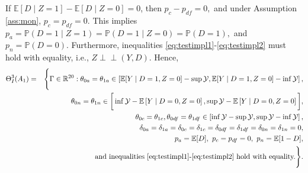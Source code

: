 \documentclass[12pt]{article}
\theoremstyle{plain}
\theoremstyle{definition}
\theoremstyle{remark}
\newcommand{\indep}{\perp \!\!\! \perp}
\begin{document}
If $\mathbb E[D\mid Z=1]-\mathbb E[D\mid Z=0]=0$, then $p_c-p_{df}=0,$ and under Assumption \ref{ass:mon}, $p_c=p_{df}=0$. This implies $p_a=\mathbb P(D=1\mid Z=1)=\mathbb P(D=1\mid Z=0)=\mathbb P(D=1),$ and $p_n=\mathbb P(D=0)$. Furthermore, inequalities \eqref{eq:testimpl1}-\eqref{eq:testimpl2} must hold with equality, i.e., $Z \indep (Y,D)$. Hence, 
\begin{eqnarray*}
    \Theta_I^3(A_1) &=& \Bigg \{\Gamma \in \mathbb R^{20}: \theta_{0a}=\theta_{1a} \in \left[\mathbb E[Y\mid D=1, Z=0]-\sup \mathcal Y, \mathbb E[Y\mid D=1, Z=0]-\inf \mathcal Y\right],\\
    && \qquad \theta_{0n}=\theta_{1n} \in \bigg[\inf \mathcal Y -\mathbb{E}\left[Y \mid D=0, Z=0\right], \sup \mathcal Y - \mathbb{E}\left[Y \mid D=0, Z=0\right]\bigg],\\ 
    && \qquad \theta_{0c}=\theta_{1c}, \theta_{0df}=\theta_{1df} \in \left[\inf \mathcal Y-\sup \mathcal Y, \sup \mathcal Y-\inf \mathcal Y\right],\\
   &&\qquad \delta_{0a}=\delta_{1a}=\delta_{0c}=\delta_{1c}=\delta_{0df}=\delta_{1df}=\delta_{0n}=\delta_{1n}=0,\\
   && \qquad p_a=\mathbb{E}[D],\ p_c=p_{df}=0,\  p_n=\mathbb{E}[1-D],\\
    && \qquad \text{and inequalities \eqref{eq:testimpl1}-\eqref{eq:testimpl2} hold with equality.}   \Bigg \}.
\end{eqnarray*}
\end{document}

